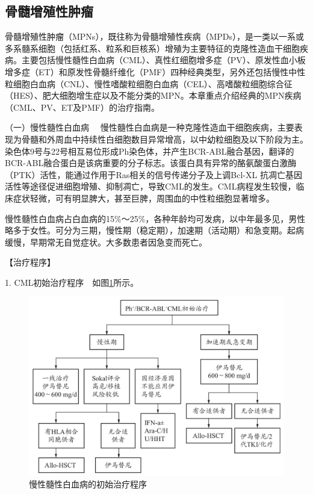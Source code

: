 \subsection{骨髓增殖性肿瘤}

骨髓增殖性肿瘤（MPNs），既往称为骨髓增殖性疾病（MPDs），是一类以一系或多系髓系细胞（包括红系、粒系和巨核系）增殖为主要特征的克隆性造血干细胞疾病。主要包括慢性髓性白血病（CML）、真性红细胞增多症（PV）、原发性血小板增多症（ET）和原发性骨髓纤维化（PMF）四种经典类型，另外还包括慢性中性粒细胞白血病（CNL）、慢性嗜酸粒细胞白血病（CEL）、高嗜酸粒细胞综合征（HES）、肥大细胞增生症以及不能分类的MPN。本章重点介绍经典的MPN疾病（CML、PV、ET及PMF）的治疗指南。

{（一）慢性髓性白血病}
　慢性髓性白血病是一种克隆性造血干细胞疾病，主要表现为骨髓和外周血中持续性白细胞数目异常增高，以中幼粒细胞及以下阶段为主。染色体9号与22号相互易位形成Ph染色体，并产生BCR-ABL融合基因，翻译的BCR-ABL融合蛋白是该病重要的分子标志。该蛋白具有异常的酪氨酸蛋白激酶（PTK）活性，能通过作用于Ras相关的信号传递分子及上调Bcl-X{L}
抗凋亡基因活性等途径促进细胞增殖、抑制凋亡，导致CML的发生。CML病程发生较慢，临床症状轻微，可有明显脾大，甚至巨脾，周围血的中性粒细胞显著增多。

慢性髓性白血病占白血病的15\%～25\%，各种年龄均可发病，以中年最多见，男性略多于女性。可分为三期，慢性期（稳定期），加速期（活动期）和急变期。起病缓慢，早期常无自觉症状。大多数患者因急变而死亡。

【治疗程序】

1. CML初始治疗程序　如图\ref{fig5-1-3}所示。

\begin{figure}[!htbp]
 \centering
 \includegraphics{./images/Image00136.jpg}
 \captionsetup{justification=centering}
 \caption{慢性髓性白血病的初始治疗程序}
 \label{fig5-1-3}
  \end{figure} 

